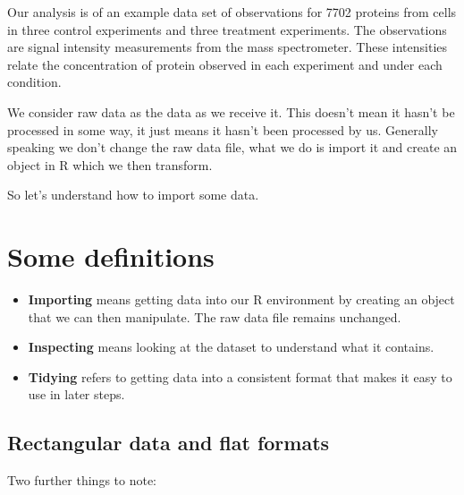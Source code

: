 \documentclass[12pt,]{book}
\providecommand{\tightlist}{%
  \setlength{\itemsep}{0pt}\setlength{\parskip}{0pt}}
\begin{document}
Our analysis is of an example data set of observations for 7702 proteins
from cells in three control experiments and three treatment experiments.
The observations are signal intensity measurements from the mass spectrometer.
These intensities relate the concentration of protein observed in each experiment
and under each condition.

We consider raw data as the data as we receive it. This doesn't mean it hasn't be
processed in some way, it just means it hasn't been processed by us.
Generally speaking we don't change the raw data file, what we do is import it and
create an object in R which we then transform.

So let's understand how to import some data.

\hypertarget{some-definitions}{%
\section{Some definitions}\label{some-definitions}}

\begin{itemize}
\tightlist
\item
  \textbf{Importing} means getting data into our R environment by creating an object
  that we can then manipulate. The raw data file remains unchanged.
\item
  \textbf{Inspecting} means looking at the dataset to understand what it contains.
\item
  \textbf{Tidying} refers to getting data into a consistent format that makes it easy
  to use in later steps.
\end{itemize}

\hypertarget{file-formats}{%
\subsection{Rectangular data and flat formats}\label{file-formats}}

Two further things to note:
\end{document}
